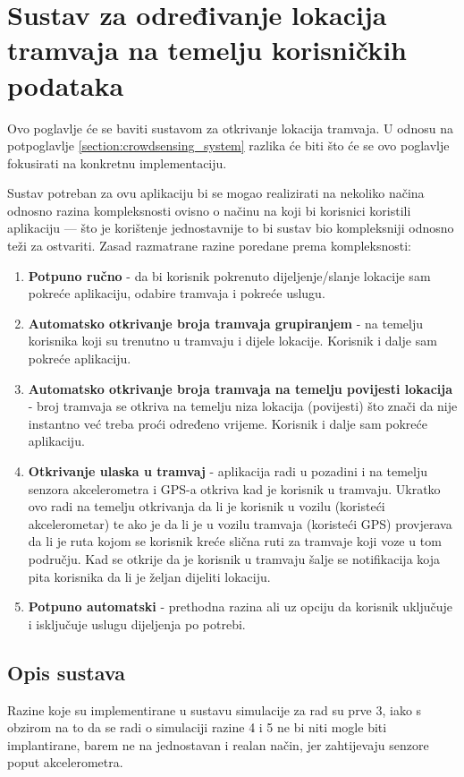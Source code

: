 \documentclass[times, utf8, diplomski]{fer}
\begin{document}
\chapter{Sustav za određivanje lokacija tramvaja na temelju korisničkih podataka}
Ovo poglavlje će se baviti sustavom za otkrivanje lokacija tramvaja. U odnosu na potpoglavlje \ref{section:crowdsensing_system} razlika će biti što će se ovo poglavlje fokusirati na konkretnu implementaciju.

Sustav potreban za ovu aplikaciju bi se mogao realizirati na nekoliko načina odnosno razina kompleksnosti ovisno o načinu na koji bi korisnici koristili aplikaciju --- što je korištenje jednostavnije to bi sustav bio kompleksniji odnosno teži za ostvariti. Zasad razmatrane razine poredane prema kompleksnosti:

\begin{enumerate}
    \item \textbf{Potpuno ručno} - da bi korisnik pokrenuto dijeljenje/slanje lokacije sam pokreće aplikaciju, odabire tramvaja i pokreće uslugu.
    \item \textbf{Automatsko otkrivanje broja tramvaja grupiranjem} - na temelju korisnika koji su trenutno u tramvaju i dijele lokacije. Korisnik i dalje sam pokreće aplikaciju.
    \item \textbf{Automatsko otkrivanje broja tramvaja na temelju povijesti lokacija} - broj tramvaja se otkriva na temelju niza lokacija (povijesti) što znači da nije instantno već treba proći određeno vrijeme. Korisnik i dalje sam pokreće aplikaciju.
    \item \textbf{Otkrivanje ulaska u tramvaj} - aplikacija radi u pozadini i na temelju senzora akcelerometra i GPS-a otkriva kad je korisnik u tramvaju. Ukratko ovo radi na temelju otkrivanja da li je korisnik u vozilu (koristeći akcelerometar) te ako je da li je u vozilu tramvaja (koristeći GPS) provjerava da li je ruta kojom se korisnik kreće slična ruti za tramvaje koji voze u tom području. Kad se otkrije da je korisnik u tramvaju šalje se notifikacija koja pita korisnika da li je željan dijeliti lokaciju.
    \item \textbf{Potpuno automatski} - prethodna razina ali uz opciju da korisnik uključuje i isključuje uslugu dijeljenja po potrebi.
\end{enumerate}


\section{Opis sustava}
Razine koje su implementirane u sustavu simulacije za rad su prve 3, iako s obzirom na to da se radi o simulaciji razine 4 i 5 ne bi niti mogle biti implantirane, barem ne na jednostavan i realan način, jer zahtijevaju senzore poput akcelerometra.
\end{document}

